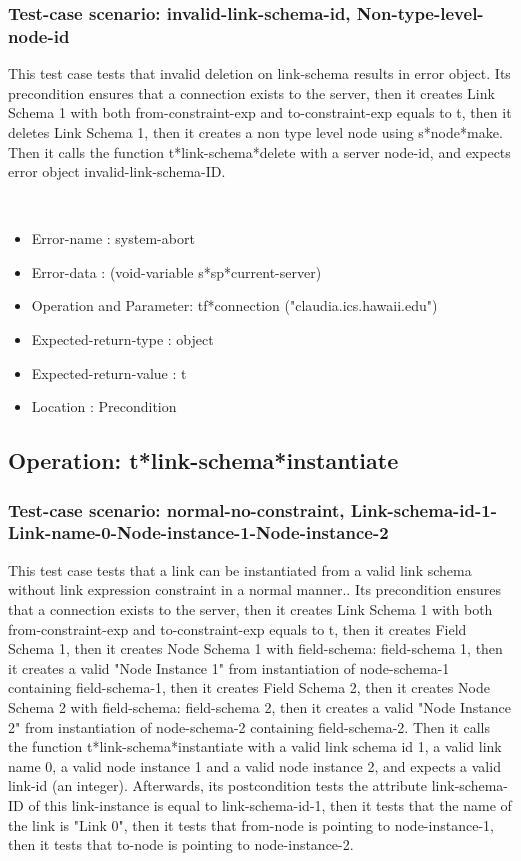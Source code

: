\subsubsection {Test-case scenario: invalid-link-schema-id, Non-type-level-node-id}


This test case tests that invalid deletion on link-schema results in error object.
Its precondition ensures that a connection exists to the server, then it creates Link Schema 1 with both from-constraint-exp and to-constraint-exp equals to t, then it deletes Link Schema 1, then it creates a non type level node using s*node*make.
Then it calls the function t*link-schema*delete  with a server node-id, and expects error object invalid-link-schema-ID.



\
\begin {itemize}
\item 	Error-name             : system-abort
\item Error-data             : (void-variable s*sp*current-server)
\item Operation and Parameter: tf*connection ("claudia.ics.hawaii.edu")
\item Expected-return-type   : object
\item Expected-return-value  : t
\item Location               : Precondition



\end {itemize}
\subsection {Operation: t*link-schema*instantiate}
\subsubsection {Test-case scenario: normal-no-constraint, Link-schema-id-1-Link-name-0-Node-instance-1-Node-instance-2}


This test case tests that a link can be instantiated from a valid link schema without link expression constraint in a normal manner..
Its precondition ensures that a connection exists to the server, then it creates Link Schema 1 with both from-constraint-exp and to-constraint-exp equals to t, then it creates Field Schema 1, then it creates Node Schema 1 with field-schema: field-schema 1, then it creates a valid "Node Instance 1" from instantiation of node-schema-1 containing field-schema-1, then it creates Field Schema 2, then it creates Node Schema 2 with field-schema: field-schema 2, then it creates a valid "Node Instance 2" from instantiation of node-schema-2 containing field-schema-2.
Then it calls the function t*link-schema*instantiate  with a valid link schema id 1, a valid link name 0, a valid node instance 1 and a valid node instance 2, and expects a valid link-id (an integer).
Afterwards, its postcondition tests the attribute link-schema-ID of this link-instance is equal to link-schema-id-1, then it tests that the name of the link is "Link 0", then it tests that from-node is pointing to node-instance-1, then it tests that to-node is pointing to node-instance-2.



